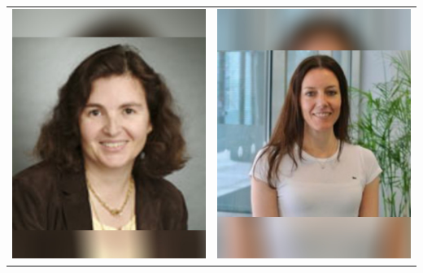 \documentclass[landscape,a0paper,fontscale=0.292]{baposter}
\begin{document}
\begin{poster}
{\begin{center}
\begin{tabularx}{\linewidth}{X X}
{\centering \includegraphics[width=0.85\linewidth]{rus.jpg}}&
{\centering \includegraphics[width=0.85\linewidth]{delvecchio.jpg}}\\ 


\end{tabularx}
\end{center}}
\end{poster}
\end{document}
